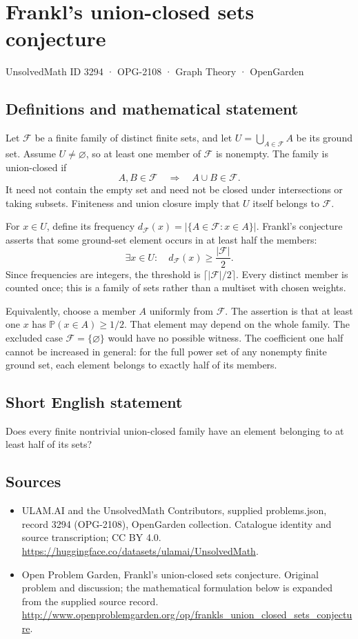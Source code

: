 \documentclass[11pt,a4paper]{article}
\begin{document}
\section*{Frankl's union-closed sets conjecture}\label{3294}
{\small UnsolvedMath ID 3294 · OPG-2108 · Graph Theory · OpenGarden}
\subsection{Definitions and mathematical statement}
Let $\mathcal F$ be a finite family of distinct finite sets, and let
$U=\bigcup_{A\in\mathcal F}A$ be its ground set. Assume $U\ne\varnothing$,
so at least one member of $\mathcal F$ is nonempty. The family is
union-closed if
\[
                 A,B\in\mathcal F\quad\Longrightarrow\quad
                 A\cup B\in\mathcal F.
\]
It need not contain the empty set and need not be closed under
intersections or taking subsets. Finiteness and union closure imply
that $U$ itself belongs to $\mathcal F$.

For $x\in U$, define its frequency
$d_{\mathcal F}(x)=|\{A\in\mathcal F:x\in A\}|$. Frankl's conjecture
asserts that some ground-set element occurs in at least half the
members:
\[
               \exists x\in U:\quad
               d_{\mathcal F}(x)\ge\frac{|\mathcal F|}{2}.
\]
Since frequencies are integers, the threshold is
$\lceil|\mathcal F|/2\rceil$. Every distinct member is counted once;
this is a family of sets rather than a multiset with chosen weights.

Equivalently, choose a member $A$ uniformly from $\mathcal F$. The
assertion is that at least one $x$ has $\mathbb P(x\in A)\ge1/2$.
That element may depend on the whole family. The excluded case
$\mathcal F=\{\varnothing\}$ would have no possible witness. The
coefficient one half cannot be increased in general: for the full
power set of any nonempty finite ground set, each element belongs to
exactly half of its members.
\subsection{Short English statement}
Does every finite nontrivial union-closed family have an element belonging to at least half of its sets?
\subsection{Sources}
\begin{itemize}
\item[S1] ULAM.AI and the UnsolvedMath Contributors, supplied problems.json, record 3294 (OPG-2108), OpenGarden collection. Catalogue identity and source transcription; CC BY 4.0.
\url{https://huggingface.co/datasets/ulamai/UnsolvedMath}.
\item[S2] Open Problem Garden, Frankl's union-closed sets conjecture. Original problem and discussion; the mathematical formulation below is expanded from the supplied source record.
\url{http://www.openproblemgarden.org/op/frankls_union_closed_sets_conjecture}.
\end{itemize}
\end{document}
